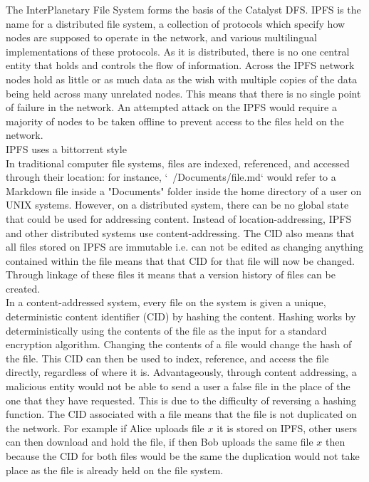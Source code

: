 The InterPlanetary File System forms the basis of the Catalyst DFS. IPFS is the name for a distributed file system, a collection of protocols which specify how nodes are supposed to operate in the network, and various multilingual implementations of these protocols. As it is distributed, there is no one central entity that holds and controls the flow of information. Across the IPFS network nodes hold as little or as much data as the wish with multiple copies of the data being held across many unrelated nodes. This means that there is no single point of failure in the network. An attempted attack on the IPFS would require a majority of nodes to be taken offline to prevent access to the files held on the network.   \\

IPFS uses a bittorrent style \\

In traditional computer file systems, files are indexed, referenced, and accessed through their location: for instance, `~/Documents/file.md` would refer to a Markdown file inside a "Documents" folder inside the home directory of a user on UNIX systems. However, on a distributed system, there can be no global state that could be used for addressing content. Instead of location-addressing, IPFS and other distributed systems use content-addressing. The CID also means that all files stored on IPFS are immutable i.e. can not be edited as changing anything contained within the file means that that CID for that file will now be changed. Through linkage of these files it means that a version history of files can be created. \\

In a content-addressed system, every file on the system is given a unique, deterministic content identifier (CID) by hashing the content. Hashing works by deterministically using the contents of the file as the input for a standard encryption algorithm. Changing the contents of a file would change the hash of the file. This CID can then be used to index, reference, and access the file directly, regardless of where it is. Advantageously, through content addressing, a malicious entity would not be able to send a user a false file in the place of the one that they have requested. This is due to the difficulty of reversing a hashing function. The CID associated with a file means that the file is not duplicated on the network. For example if Alice uploads file $x$ it is stored on IPFS, other users can then download and hold the file, if then Bob uploads the same file $x$ then because the CID for both files would be the same the duplication would not take place as the file is already held on the file system.  \\

